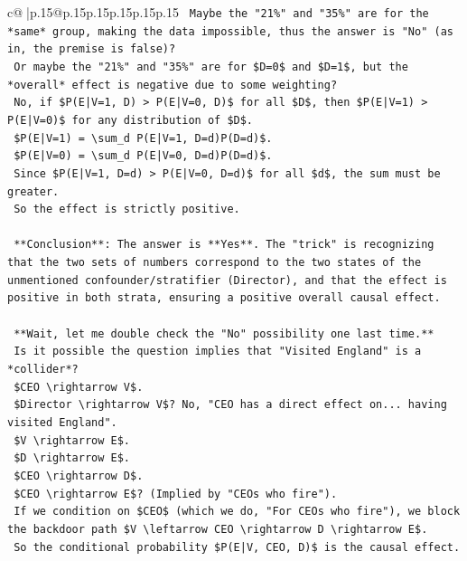 \documentclass{article}
\begin{document}
{\begin{supertabular}{c@{$\;$}|p{.15\linewidth}@{}p{.15\linewidth}p{.15\linewidth}p{.15\linewidth}p{.15\linewidth}p{.15\linewidth}}
{{{\texttt{    Maybe the "21\%" and "35\%" are for the *same* group, making the data impossible, thus the answer is "No" (as in, the premise is false)?} \\
\texttt{    Or maybe the "21\%" and "35\%" are for \$D=0\$ and \$D=1\$, but the *overall* effect is negative due to some weighting?} \\
\texttt{    No, if \$P(E|V=1, D) > P(E|V=0, D)\$ for all \$D\$, then \$P(E|V=1) > P(E|V=0)\$ for any distribution of \$D\$.} \\
\texttt{    \$P(E|V=1) = \textbackslash{}sum\_d P(E|V=1, D=d)P(D=d)\$.} \\
\texttt{    \$P(E|V=0) = \textbackslash{}sum\_d P(E|V=0, D=d)P(D=d)\$.} \\
\texttt{    Since \$P(E|V=1, D=d) > P(E|V=0, D=d)\$ for all \$d\$, the sum must be greater.} \\
\texttt{    So the effect is strictly positive.} \\
\\ 
\texttt{    **Conclusion**: The answer is **Yes**. The "trick" is recognizing that the two sets of numbers correspond to the two states of the unmentioned confounder/stratifier (Director), and that the effect is positive in both strata, ensuring a positive overall causal effect.} \\
\\ 
\texttt{    **Wait, let me double check the "No" possibility one last time.**} \\
\texttt{    Is it possible the question implies that "Visited England" is a *collider*?} \\
\texttt{    \$CEO \textbackslash{}rightarrow V\$.} \\
\texttt{    \$Director \textbackslash{}rightarrow V\$? No, "CEO has a direct effect on... having visited England".} \\
\texttt{    \$V \textbackslash{}rightarrow E\$.} \\
\texttt{    \$D \textbackslash{}rightarrow E\$.} \\
\texttt{    \$CEO \textbackslash{}rightarrow D\$.} \\
\texttt{    \$CEO \textbackslash{}rightarrow E\$? (Implied by "CEOs who fire").} \\
\texttt{    If we condition on \$CEO\$ (which we do, "For CEOs who fire"), we block the backdoor path \$V \textbackslash{}leftarrow CEO \textbackslash{}rightarrow D \textbackslash{}rightarrow E\$.} \\
\texttt{    So the conditional probability \$P(E|V, CEO, D)\$ is the causal effect.} \\
}}}
\end{supertabular}}
\end{document}
